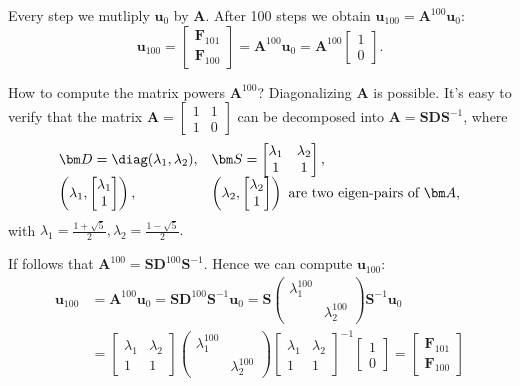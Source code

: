 Every step we mutliply $\bm u_0$ by $\bm A$. After 100 steps we obtain $\bm u_{100}=\bm A^{100}\bm u_0$:
\[
\bm u_{100}=\begin{bmatrix}
\bm F_{101}\\\bm F_{100}
\end{bmatrix}=\bm A^{100}\bm u_0=\bm A^{100}\begin{bmatrix}
1\\0
\end{bmatrix}.
\]

How to compute the matrix powers $\bm A^{100}$? Diagonalizing $\bm A$ is possible. It's easy to verify that the matrix $\bm A=\begin{bmatrix}
1&1\\1&0
\end{bmatrix}$ can be decomposed into $
\bm A=\bm S\bm D\bm S^{-1}
$, where
\[
\begin{array}{ll}
\bm D=\diag(\lambda_1,\lambda_2),
&
\bm S=\begin{bmatrix}
\lambda_1&\lambda_2\\1&1
\end{bmatrix},\\
\left(\lambda_1,\begin{bmatrix}
\lambda_1\\1
\end{bmatrix}\right),
&
\left(\lambda_2,\begin{bmatrix}
\lambda_2\\1
\end{bmatrix}\right)
\mbox{ are two eigen-pairs of $\bm A$},
\end{array}
\]
with $\lambda_1=\frac{1+\sqrt{5}}{2},\lambda_2=\frac{1-\sqrt{5}}{2}.$

If follows that $\bm A^{100}=\bm S\bm D^{100}\bm S^{-1}$. Hence we can compute $\bm u_{100}$:
\begin{align*}
\bm u_{100}&=\bm A^{100}\bm u_0=\bm S\bm D^{100}\bm S^{-1}\bm u_0=\bm S\begin{pmatrix}
\lambda_1^{100}&\\&\lambda_2^{100}
\end{pmatrix}\bm S^{-1}\bm u_0
\\&=\begin{bmatrix}
\lambda_1&\lambda_2\\1&1
\end{bmatrix}\begin{pmatrix}
\lambda_1^{100}&\\&\lambda_2^{100}
\end{pmatrix}\begin{bmatrix}
\lambda_1&\lambda_2\\1&1
\end{bmatrix}^{-1}\begin{bmatrix}
1\\0
\end{bmatrix}=\begin{bmatrix}
\bm F_{101}\\\bm F_{100}
\end{bmatrix}
\end{align*}


